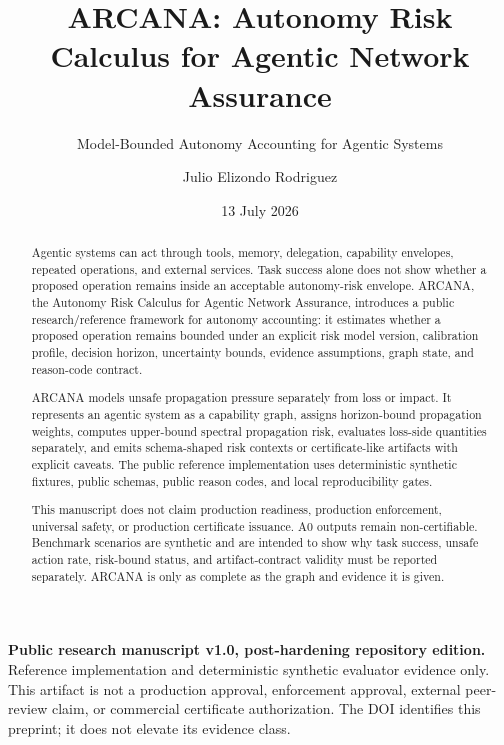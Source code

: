 \documentclass[
  american,
  a4paper,
  10pt]{article}
\title{ARCANA: Autonomy Risk Calculus for Agentic Network Assurance}
\subtitle{Model-Bounded Autonomy Accounting for Agentic Systems}
\author{Julio Elizondo Rodriguez}
\date{13 July 2026}
\begin{document}
\maketitle

\noindent
\colorbox{ArcanaPale}{%
  \parbox{\dimexpr\textwidth-2\fboxsep\relax}{%
    \small\sffamily
    \textbf{Public research manuscript v1.0, post-hardening repository edition.}
    Reference implementation and deterministic synthetic evaluator evidence
    only. This artifact is not a production approval, enforcement approval,
    external peer-review claim, or commercial certificate authorization. The
    DOI identifies this preprint; it does not elevate its evidence class.
  }%
}
\vspace{10pt}

\begin{abstract}
Agentic systems can act through tools, memory, delegation, capability envelopes,
repeated operations, and external services. Task success alone does not show whether a
proposed operation remains inside an acceptable autonomy-risk envelope. ARCANA, the
Autonomy Risk Calculus for Agentic Network Assurance, introduces a public
research/reference framework for autonomy accounting: it estimates whether a proposed
operation remains bounded under an explicit risk model version, calibration profile,
decision horizon, uncertainty bounds, evidence assumptions, graph state, and reason-code
contract.

ARCANA models unsafe propagation pressure separately from loss or impact. It represents
an agentic system as a capability graph, assigns horizon-bound propagation weights,
computes upper-bound spectral propagation risk, evaluates loss-side quantities
separately, and emits schema-shaped risk contexts or certificate-like artifacts with
explicit caveats. The public reference implementation uses deterministic synthetic
fixtures, public schemas, public reason codes, and local reproducibility gates.

This manuscript does not claim production readiness, production enforcement, universal
safety, or production certificate issuance. A0 outputs remain non-certifiable. Benchmark
scenarios are synthetic and are intended to show why task success, unsafe action rate,
risk-bound status, and artifact-contract validity must be reported separately. ARCANA is
only as complete as the graph and evidence it is given.
\end{abstract}

\clearpage
\tableofcontents
\clearpage
\end{document}
